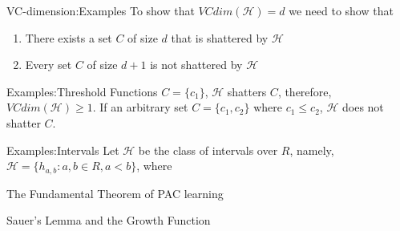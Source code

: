 \documentclass{beamer}
\begin{document}
\begin{frame}{VC-dimension:Examples}
	To show that $VCdim(\mathcal{H})=d$ we need to show that 
	\begin{enumerate}
		\item There exists a set $C$ of size $d$ that is shattered  by $\mathcal{H}$
		\item Every set $C$ of size $d+1$ is not shattered by $\mathcal{H}$
	\end{enumerate}
\end{frame}
\begin{frame}{Examples:Threshold Functions}
	$C=\{c_1\}$, $\mathcal{H}$ shatters $C$, therefore, $VCdim(\mathcal{H}) \geq 1$. If an arbitrary set $C = \{c_1,c_2\}$ where $c_1 \leq c_2$, $\mathcal{H}$ does not shatter $C$.
\end{frame}
\begin{frame}{Examples:Intervals}
	Let $\mathcal{H}$ be the class of intervals over $R$, namely, $\mathcal{H} = \{h_{a,b}:a,b \in R,a<b\}$, where
\end{frame}
\begin{frame}{The Fundamental Theorem of PAC learning}
\end{frame}
\begin{frame}{Sauer's Lemma and the Growth Function}
\end{frame}
\end{document}
